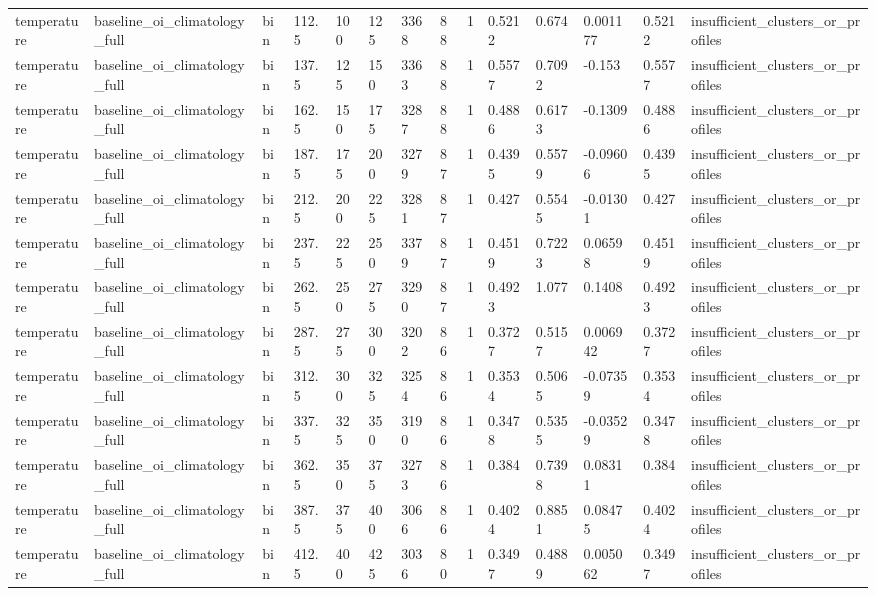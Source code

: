 \begin{table}[htbp]
\begin{tabular}{llllllllllllll}
temperature & baseline\_oi\_climatology\_full & bin & 112.5 & 100 & 125 & 3368 & 88 & 1 & 0.5212 & 0.674 & 0.001177 & 0.5212 & insufficient\_clusters\_or\_profiles \\
temperature & baseline\_oi\_climatology\_full & bin & 137.5 & 125 & 150 & 3363 & 88 & 1 & 0.5577 & 0.7092 & -0.153 & 0.5577 & insufficient\_clusters\_or\_profiles \\
temperature & baseline\_oi\_climatology\_full & bin & 162.5 & 150 & 175 & 3287 & 88 & 1 & 0.4886 & 0.6173 & -0.1309 & 0.4886 & insufficient\_clusters\_or\_profiles \\
temperature & baseline\_oi\_climatology\_full & bin & 187.5 & 175 & 200 & 3279 & 87 & 1 & 0.4395 & 0.5579 & -0.09606 & 0.4395 & insufficient\_clusters\_or\_profiles \\
temperature & baseline\_oi\_climatology\_full & bin & 212.5 & 200 & 225 & 3281 & 87 & 1 & 0.427 & 0.5545 & -0.01301 & 0.427 & insufficient\_clusters\_or\_profiles \\
temperature & baseline\_oi\_climatology\_full & bin & 237.5 & 225 & 250 & 3379 & 87 & 1 & 0.4519 & 0.7223 & 0.06598 & 0.4519 & insufficient\_clusters\_or\_profiles \\
temperature & baseline\_oi\_climatology\_full & bin & 262.5 & 250 & 275 & 3290 & 87 & 1 & 0.4923 & 1.077 & 0.1408 & 0.4923 & insufficient\_clusters\_or\_profiles \\
temperature & baseline\_oi\_climatology\_full & bin & 287.5 & 275 & 300 & 3202 & 86 & 1 & 0.3727 & 0.5157 & 0.006942 & 0.3727 & insufficient\_clusters\_or\_profiles \\
temperature & baseline\_oi\_climatology\_full & bin & 312.5 & 300 & 325 & 3254 & 86 & 1 & 0.3534 & 0.5065 & -0.07359 & 0.3534 & insufficient\_clusters\_or\_profiles \\
temperature & baseline\_oi\_climatology\_full & bin & 337.5 & 325 & 350 & 3190 & 86 & 1 & 0.3478 & 0.5355 & -0.03529 & 0.3478 & insufficient\_clusters\_or\_profiles \\
temperature & baseline\_oi\_climatology\_full & bin & 362.5 & 350 & 375 & 3273 & 86 & 1 & 0.384 & 0.7398 & 0.08311 & 0.384 & insufficient\_clusters\_or\_profiles \\
temperature & baseline\_oi\_climatology\_full & bin & 387.5 & 375 & 400 & 3066 & 86 & 1 & 0.4024 & 0.8851 & 0.08475 & 0.4024 & insufficient\_clusters\_or\_profiles \\
temperature & baseline\_oi\_climatology\_full & bin & 412.5 & 400 & 425 & 3036 & 80 & 1 & 0.3497 & 0.4889 & 0.005062 & 0.3497 & insufficient\_clusters\_or\_profiles \\

\end{tabular}
\end{table}
